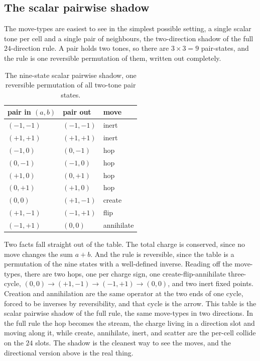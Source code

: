 \subsection{The scalar pairwise shadow}

The move-types are easiest to see in the simplest possible setting, a single scalar tone per cell and a single
pair of neighbours, the two-direction shadow of the full $24$-direction rule. A pair holds two tones, so there
are $3 \times 3 = 9$ pair-states, and the rule is one reversible permutation of them, written out completely.

\begin{table}[h]
\centering
\begin{tabular}{lll}
\toprule
pair in $(a,b)$ & pair out & move \\
\midrule
$(-1,-1)$ & $(-1,-1)$ & inert \\
$(+1,+1)$ & $(+1,+1)$ & inert \\
$(-1,0)$ & $(0,-1)$ & hop \\
$(0,-1)$ & $(-1,0)$ & hop \\
$(+1,0)$ & $(0,+1)$ & hop \\
$(0,+1)$ & $(+1,0)$ & hop \\
$(0,0)$ & $(+1,-1)$ & create \\
$(+1,-1)$ & $(-1,+1)$ & flip \\
$(-1,+1)$ & $(0,0)$ & annihilate \\
\bottomrule
\end{tabular}
\caption{The nine-state scalar pairwise shadow, one reversible permutation of all two-tone pair states.}
\end{table}

Two facts fall straight out of the table. The total charge is conserved, since no move changes the sum $a + b$.
And the rule is reversible, since the table is a permutation of the nine states with a well-defined inverse.
Reading off the move-types, there are two hops, one per charge sign, one create-flip-annihilate three-cycle,
$(0,0) \to (+1,-1) \to (-1,+1) \to (0,0)$, and two inert fixed points. Creation and annihilation are the same
operator at the two ends of one cycle, forced to be inverses by reversibility, and that cycle is the arrow. This
table is the scalar pairwise shadow of the full rule, the same move-types in two directions. In the full rule the
hop becomes the stream, the charge living in a direction slot and moving along it, while create, annihilate,
inert, and scatter are the per-cell collide on the $24$ slots. The shadow is the cleanest way to see the moves,
and the directional version above is the real thing.

